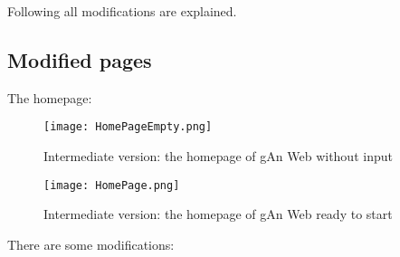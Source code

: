 Following all modifications are explained.

\subsection{Modified pages}
The homepage:

\begin{figure}[H]
\centering
\texttt{[image: HomePageEmpty.png]} 
\caption{Intermediate version: the homepage of gAn Web without input}
\end{figure}


\begin{figure}[H]
\centering
\texttt{[image: HomePage.png]} 
\caption{Intermediate version: the homepage of gAn Web ready to start}
\end{figure}

There are some modifications:

